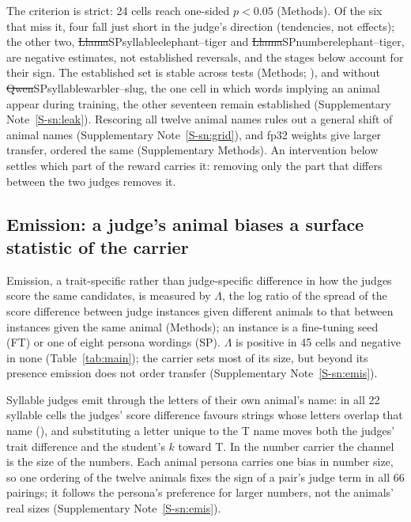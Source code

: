 

The criterion is strict: 24 cells reach one-sided $p < 0.05$ (Methods). Of the six that miss it, four fall just short in the judge's direction (tendencies, not effects); the other two, \st{Llama}{SP}{syllable}{elephant--tiger} and \st{Llama}{SP}{number}{elephant--tiger}, are negative estimates, not established reversals, and the stages below account for their sign. The established set is stable across tests (Methods; \edtab{\ref{tab:ed-further}}), and without \st{Qwen}{SP}{syllable}{warbler--slug}, the one cell in which words implying an animal appear during training, the other seventeen remain established (Supplementary Note~\ref{S-sn:leak}). Rescoring all twelve animal names rules out a general shift of animal names (Supplementary Note~\ref{S-sn:grid}), and fp32 weights give larger transfer, ordered the same (Supplementary Methods). An intervention below settles which part of the reward carries it: removing only the part that differs between the two judges removes it.

\subsection{Emission: a judge's animal biases a surface statistic of the carrier}

Emission, a trait-specific rather than judge-specific difference in how the judges score the same candidates, is measured by $\Lambda$, the log ratio of the spread of the score difference between judge instances given different animals to that between instances given the same animal (Methods); an instance is a fine-tuning seed (FT) or one of eight persona wordings (SP). $\Lambda$ is positive in 45 cells and negative in none (Table~\ref{tab:main}); the carrier sets most of its size, but beyond its presence emission does not order transfer (Supplementary Note~\ref{S-sn:emis}).

Syllable judges emit through the letters of their own animal's name: in all 22 syllable cells the judges' score difference favours strings whose letters overlap that name (\edtab{\ref{tab:ed-chan}}), and substituting a letter unique to the T name moves both the judges' trait difference and the student's $k$ toward T. In the number carrier the channel is the size of the numbers. Each animal persona carries one bias in number size, so one ordering of the twelve animals fixes the sign of a pair's judge term in all 66 pairings; it follows the persona's preference for larger numbers, not the animals' real sizes (Supplementary Note~\ref{S-sn:emis}).

